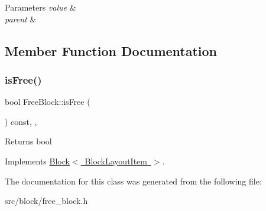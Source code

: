 \begin{DoxyParams}{Parameters}
{\em value} & \\
\hline
{\em parent} & \\
\hline
\end{DoxyParams}


\subsection{Member Function Documentation}
\mbox{\label{class_free_block_a76d3f40934d42c566095ee2f1386eac5}} 
\subsubsection{\texorpdfstring{isFree()}{isFree()}}
{\footnotesize\ttfamily bool Free\+Block\+::is\+Free (\begin{DoxyParamCaption}{ }\end{DoxyParamCaption}) const\hspace{0.3cm}{\ttfamily [inline]}, {\ttfamily [override]}, {\ttfamily [virtual]}}

\begin{DoxyReturn}{Returns}
bool 
\end{DoxyReturn}


Implements \mbox{\hyperlink{class_block_a795e0536746b840286cb1e74487311a9}{Block$<$ Block\+Layout\+Item $>$}}.



The documentation for this class was generated from the following file\+:\begin{DoxyCompactItemize}
\item 
src/block/free\+\_\+block.\+h\end{DoxyCompactItemize}
